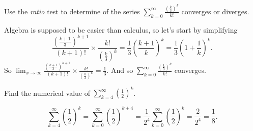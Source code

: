\documentclass[12pt,answers,fleqn]{exam}
\begin{document}
\begin{questions}
\question [1] Use the \emph{ratio} test to determine of the series $\sum_{k=0}^\infty \frac{  \left(\frac{k}{3} \right)^k }{ k!}$ converges or diverges.
\begin{solution}%
Algebra is supposed to be easier than calculus, so let's start by simplifying
\begin{equation*}
\frac{ (\frac{k+1}{3})^{k+1}}{(k+1)!} \times \frac{k!}{ \left(\frac{k}{3} \right)^k} = 
\frac{1}{3} (\frac{k+1}{k})^k = \frac{1}{3}  \left(1 + \frac{1}{k} \right)^k.
\end{equation*}
So $\displaystyle  \lim_{x \to \infty} \frac{ (\frac{k+1}{3})^{k+1}}{(k+1)!} \times \frac{k!}{ (\frac{k}{3})^k} = \frac{1}{3}$.
And so $\displaystyle \sum_{k=0}^\infty \frac{  \left(\frac{k}{3} \right)^k }{ k!}$ converges. 
\end{solution}



\question [5] Find the numerical value of  \(\displaystyle \sum_{k=4}^\infty \left(\frac{1}{2} \right)^k \).
\begin{solution}[2.5in]
\[
 \sum_{k=4}^\infty \left(\frac{1}{2} \right)^k = \sum_{k=0}^\infty \left(\frac{1}{2} \right)^{k + 4}
  = \frac{1}{2^4} \sum_{k=0}^\infty \left(\frac{1}{2} \right)^{k} = \frac{2}{2^4} = \frac{1}{8}.
\]
\end{solution}



\end{questions}
\end{document}
